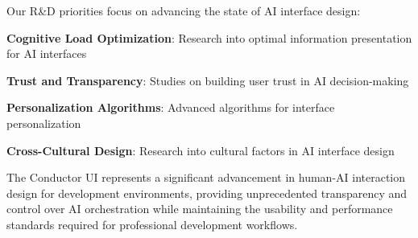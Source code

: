 Our R\&D priorities focus on advancing the state of AI interface design:

\begin{expandedlist}
    \item \textbf{Cognitive Load Optimization}: Research into optimal information presentation for AI interfaces
    \item \textbf{Trust and Transparency}: Studies on building user trust in AI decision-making
    \item \textbf{Personalization Algorithms}: Advanced algorithms for interface personalization
    \item \textbf{Cross-Cultural Design}: Research into cultural factors in AI interface design
\end{expandedlist}

The Conductor UI represents a significant advancement in human-AI interaction design for development environments, providing unprecedented transparency and control over AI orchestration while maintaining the usability and performance standards required for professional development workflows.
